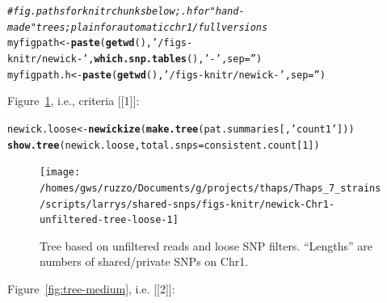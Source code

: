 \documentclass{article}\usepackage[]{graphicx}\usepackage[]{color}
\makeatletter
\newcommand{\hlnum}[1]{\textcolor[rgb]{0.686,0.059,0.569}{#1}}%
\newcommand{\hlstr}[1]{\textcolor[rgb]{0.192,0.494,0.8}{#1}}%
\newcommand{\hlcom}[1]{\textcolor[rgb]{0.678,0.584,0.686}{\textit{#1}}}%
\newcommand{\hlstd}[1]{\textcolor[rgb]{0.345,0.345,0.345}{#1}}%
\newcommand{\hlkwb}[1]{\textcolor[rgb]{0.69,0.353,0.396}{#1}}%
\newcommand{\hlkwc}[1]{\textcolor[rgb]{0.333,0.667,0.333}{#1}}%
\newcommand{\hlkwd}[1]{\textcolor[rgb]{0.737,0.353,0.396}{\textbf{#1}}}%
\newenvironment{kframe}{%
 \def\at@end@of@kframe{}%
 \ifinner\ifhmode%
  \def\at@end@of@kframe{\end{minipage}}%
  \begin{minipage}{\columnwidth}%
 \fi\fi%
 \def\FrameCommand##1{\hskip\@totalleftmargin \hskip-\fboxsep
 \colorbox{shadecolor}{##1}\hskip-\fboxsep
     \hskip-\linewidth \hskip-\@totalleftmargin \hskip\columnwidth}%
 \MakeFramed {\advance\hsize-\width
   \@totalleftmargin\z@ \linewidth\hsize
   \@setminipage}}%
 {\par\unskip\endMakeFramed%
 \at@end@of@kframe}
\newenvironment{knitrout}{}{} %
\makeatother
\begin{document}
\begin{knitrout}\scriptsize
{}\color{fgcolor}\begin{kframe}
\begin{alltt}
\hlcom{# fig.paths for knitr chunks below;  .h for "hand-made" trees; plain for automatic chr1/full versions}
\hlstd{myfigpath}   \hlkwb{<-} \hlkwd{paste}\hlstd{(}\hlkwd{getwd}\hlstd{(),} \hlstr{'/figs-knitr/newick-'}\hlstd{,} \hlkwd{which.snp.tables}\hlstd{(),} \hlstr{'-'}\hlstd{,} \hlkwc{sep}\hlstd{=}\hlstr{''}\hlstd{)}
\hlstd{myfigpath.h} \hlkwb{<-} \hlkwd{paste}\hlstd{(}\hlkwd{getwd}\hlstd{(),} \hlstr{'/figs-knitr/newick-'}\hlstd{,} \hlkwc{sep}\hlstd{=}\hlstr{''}\hlstd{)}
\end{alltt}
\end{kframe}
\end{knitrout}

Figure~\ref{fig:tree-loose}, i.e., criteria [[1]]:

\begin{knitrout}\scriptsize
{}\color{fgcolor}\begin{kframe}
\begin{alltt}
\hlstd{newick.loose} \hlkwb{<-} \hlkwd{newickize}\hlstd{(}\hlkwd{make.tree}\hlstd{(pat.summaries[,}\hlstr{'count1'}\hlstd{]))}
\hlkwd{show.tree}\hlstd{(newick.loose,} \hlkwc{total.snps}\hlstd{=consistent.count[}\hlnum{1}\hlstd{])}
\end{alltt}
\end{kframe}\begin{figure}

{\centering \texttt{[image: /homes/gws/ruzzo/Documents/g/projects/thaps/Thaps\_7\_strains/scripts/larrys/shared-snps/figs-knitr/newick-Chr1-unfiltered-tree-loose-1]} 

}

\caption[Tree based on unfiltered reads and loose SNP filters]{Tree based on unfiltered reads and loose SNP filters.  ``Lengths'' are numbers of shared/private SNPs on Chr1.}\label{fig:tree-loose}
\end{figure}


\end{knitrout}

Figure~\ref{fig:tree-medium}, i.e. [[2]]:
\end{document}
